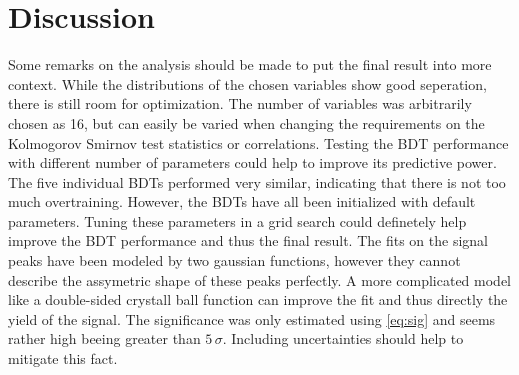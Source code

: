 \section{Discussion}
\label{sec:Discussion}

Some remarks on the analysis should be made to put the final result into more context.
While the distributions of the chosen variables show good seperation, there is still room for optimization. The number of variables was arbitrarily chosen as 16,
but can easily be varied when changing the requirements on the Kolmogorov Smirnov test statistics or correlations. Testing the BDT performance with different number of
parameters could help to improve its predictive power. The five individual BDTs performed very similar, indicating that there is not too much overtraining.
However, the BDTs have all been initialized with default parameters. Tuning these parameters in a grid search could definetely help improve the BDT performance and thus
the final result.
The fits on the signal peaks have been modeled by two gaussian functions, however they cannot describe the assymetric shape of these peaks perfectly.
A more complicated model like a double-sided crystall ball function can improve the fit and thus directly the yield of the signal.
The significance was only estimated using \eqref{eq:sig} and seems rather high beeing greater than $5 \, \sigma$. Including uncertainties should help to mitigate this fact.